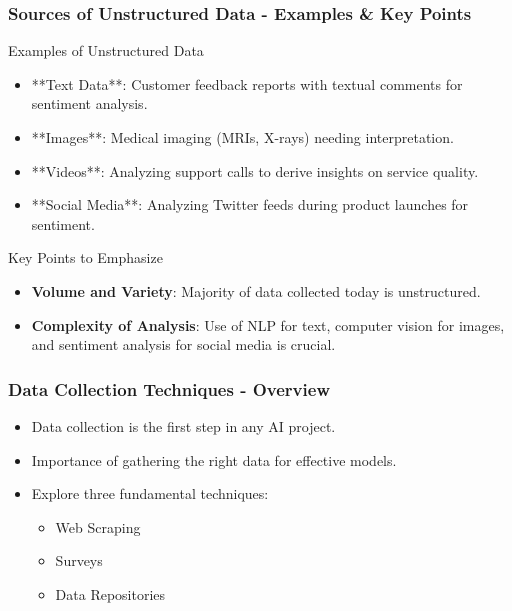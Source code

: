 \documentclass[aspectratio=169]{beamer}
\begin{document}
\begin{frame}[fragile]
    \frametitle{Sources of Unstructured Data - Examples & Key Points}
    \begin{block}{Examples of Unstructured Data}
        \begin{itemize}
            \item **Text Data**: Customer feedback reports with textual comments for sentiment analysis.
            \item **Images**: Medical imaging (MRIs, X-rays) needing interpretation.
            \item **Videos**: Analyzing support calls to derive insights on service quality.
            \item **Social Media**: Analyzing Twitter feeds during product launches for sentiment.
        \end{itemize}
    \end{block}
    \begin{block}{Key Points to Emphasize}
        \begin{itemize}
            \item \textbf{Volume and Variety}: Majority of data collected today is unstructured.
            \item \textbf{Complexity of Analysis}: Use of NLP for text, computer vision for images, and sentiment analysis for social media is crucial.
        \end{itemize}
    \end{block}
\end{frame}

\begin{frame}[fragile]
    \frametitle{Data Collection Techniques - Overview}
    \begin{itemize}
        \item Data collection is the first step in any AI project.
        \item Importance of gathering the right data for effective models.
        \item Explore three fundamental techniques: 
            \begin{itemize}
                \item Web Scraping
                \item Surveys
                \item Data Repositories
            \end{itemize}
    \end{itemize}
\end{frame}
\end{document}
